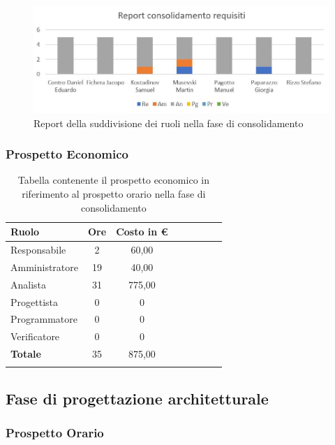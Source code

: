\documentclass[../piano_di_progetto.tex]{subfiles}
\begin{document}
\begin{figure}[H]
\centering
\includegraphics[width=12cm]{componenti/img/report_consolidamento}
\caption{Report della suddivisione dei ruoli nella fase di consolidamento}
\end{figure}

\subsubsection{Prospetto Economico}

\begin{longtable}{|l|c|c|c|c|c|c|c|}
	\hline
	\rowcolor{lightgray}
	\textbf{Ruolo} & \textbf{Ore} & \textbf{Costo in €}\\
	\endhead
	\hline
	Responsabile & 2 & 60,00 \\
	\hline
	Amministratore & 19 & 40,00 \\
	\hline
	Analista & 31 & 775,00 \\
	\hline
	Progettista & 0 & 0 \\
	\hline
	Programmatore & 0 & 0 \\
	\hline
	Verificatore & 0 & 0 \\
	\hline
	\textbf{Totale} & 35 & 875,00 \\
	\hline
	\rowcolor{white}
	\caption{Tabella contenente il prospetto economico in riferimento al prospetto orario nella fase di consolidamento} 
\end{longtable}


\subsection{ Fase di progettazione architetturale}%
\label{sub:fase_prog_arc}
\subsubsection{Prospetto Orario}
\end{document}
